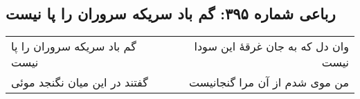 \begin{center}
\section*{رباعی شماره ۳۹۵: گم باد سریکه سروران را پا نیست}
\label{sec:0395}
\begin{longtable}{l p{0.5cm} r}
گم باد سریکه سروران را پا نیست
&&
وان دل که به جان غرقهٔ این سودا نیست
\\
گفتند در این میان نگنجد موئی
&&
من موی شدم از آن مرا گنجانیست
\\
\end{longtable}
\end{center}
